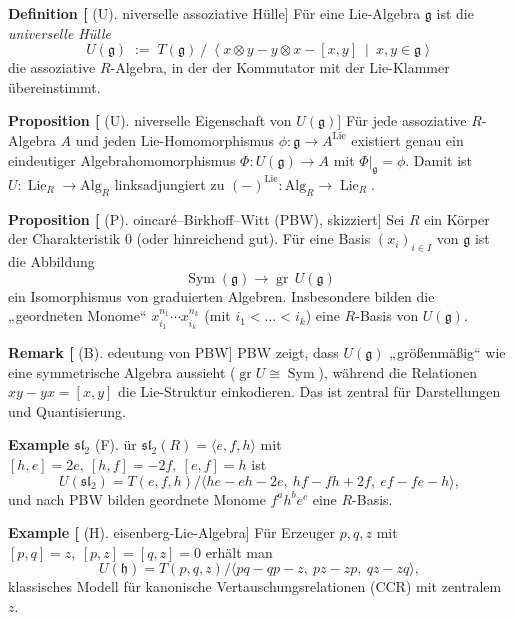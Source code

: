 \documentclass[10pt, letterpaper]{article}
\newcommand{\Alg}{\mathrm{Alg}}
\newcommand{\CustomHeading}[3]{%
  \par\medskip\noindent%
  \textbf{#1 #2} \textnormal{(#3)}.\enskip%
}
\newenvironment{DEF}[2]{\begin{unitbox}\CustomHeading{Definition}{#1}{#2}}{\end{unitbox}}
\newenvironment{PROP}[2]{\begin{unitbox}\CustomHeading{Proposition}{#1}{#2}}{\end{unitbox}}
\newenvironment{REM}[2]{\begin{unitbox}\CustomHeading{Remark}{#1}{#2}}{\end{unitbox}}
\newenvironment{EXA}[2]{\begin{unitbox}\CustomHeading{Example}{#1}{#2}}{\end{unitbox}}
\begin{document}
\begin{DEF}[Universelle assoziative Hülle]
Für eine Lie-Algebra \(\mathfrak{g}\) ist die \emph{universelle Hülle}
\[
U(\mathfrak{g})\;:=\; T(\mathfrak{g})\ \big/\
\left\langle x\otimes y - y\otimes x - [x,y]\ \middle|\ x,y\in\mathfrak{g}\right\rangle
\]
die assoziative \(R\)-Algebra, in der der Kommutator mit der Lie-Klammer übereinstimmt.
\end{DEF}

\begin{PROP}[Universelle Eigenschaft von \(U(\mathfrak{g})\)]
Für jede assoziative \(R\)-Algebra \(A\) und jeden Lie-Homomorphismus
\(\phi:\mathfrak{g}\to A^{\operatorname{Lie}}\) existiert genau ein eindeutiger
Algebrahomomorphismus \(\Phi:U(\mathfrak{g})\to A\) mit \(\Phi|_{\mathfrak{g}}=\phi\).
Damit ist \(U:\operatorname{Lie}_R\to\Alg_R\) linksadjungiert zu \((-)^{\operatorname{Lie}}:\Alg_R\to\operatorname{Lie}_R\).
\end{PROP}

\begin{PROP}[Poincaré–Birkhoff–Witt (PBW), skizziert]
Sei \(R\) ein Körper der Charakteristik \(0\) (oder hinreichend gut). Für eine Basis
\((x_i)_{i\in I}\) von \(\mathfrak{g}\) ist die Abbildung
\[
\operatorname{Sym}(\mathfrak{g}) \longrightarrow \operatorname{gr}\,U(\mathfrak{g})
\]
ein Isomorphismus von graduierten Algebren. Insbesondere bilden die „geordneten Monome“
\(x_{i_1}^{n_1}\cdots x_{i_k}^{n_k}\) (mit \(i_1<\dots<i_k\)) eine \(R\)-Basis von \(U(\mathfrak{g})\).
\end{PROP}

\begin{REM}[Bedeutung von PBW]
PBW zeigt, dass \(U(\mathfrak{g})\) „größenmäßig“ wie eine symmetrische Algebra aussieht
(\(\operatorname{gr}U\cong \operatorname{Sym}\)), während die Relationen \(xy-yx=[x,y]\) die
Lie-Struktur einkodieren. Das ist zentral für Darstellungen und Quantisierung.
\end{REM}

\begin{EXA}{\(\mathfrak{sl}_2\)}
Für \(\mathfrak{sl}_2(R)=\langle e,f,h\rangle\) mit
\([h,e]=2e,\ [h,f]=-2f,\ [e,f]=h\) ist
\[
U(\mathfrak{sl}_2)=T(e,f,h)\Big/\big\langle he-eh-2e,\ hf-fh+2f,\ ef-fe-h\big\rangle,
\]
und nach PBW bilden geordnete Monome \(f^a h^b e^c\) eine \(R\)-Basis.
\end{EXA}

\begin{EXA}[Heisenberg-Lie-Algebra]
Für Erzeuger \(p,q,z\) mit \([p,q]=z,\ [p,z]=[q,z]=0\) erhält man
\[
U(\mathfrak{h}) = T(p,q,z)\Big/\langle pq-qp-z,\ pz-zp,\ qz-zq\rangle,
\]
klassisches Modell für kanonische Vertauschungsrelationen (CCR) mit zentralem \(z\).
\end{EXA}
\end{document}
